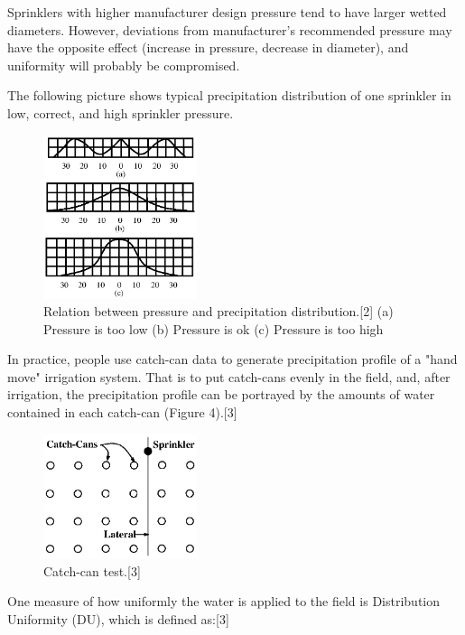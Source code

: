 \documentclass[12pt,a4paper,titlepage]{article}
\begin{document}
Sprinklers with higher manufacturer design pressure tend to have
larger wetted diameters. However, deviations from manufacturer's
recommended pressure may have the opposite effect (increase in
pressure, decrease in diameter), and uniformity will probably be
compromised.

The following picture shows typical precipitation distribution of
one sprinkler in low, correct, and high sprinkler pressure.


\begin{figure}[!htb]
\centering
\includegraphics[width=0.4\textwidth]{fig03.eps}
\caption{\label{fig03} Relation between pressure and precipitation
distribution.[2] (a) Pressure is too low (b) Pressure is ok (c)
Pressure is too high }
\end{figure}

In practice, people use catch-can data to generate precipitation
profile of a "hand move" irrigation system. That is to put
catch-cans evenly in the field, and, after irrigation, the
precipitation profile can be portrayed by the amounts of water
contained in each catch-can (Figure 4).[3]

\begin{figure}[!htb]
\centering
\includegraphics[width=0.4\textwidth]{fig04.eps}
\caption{\label{fig04} Catch-can test.[3] }
\end{figure}

One measure of how uniformly the water is applied to the field is
Distribution Uniformity (DU), which is defined as:[3]
\end{document}
